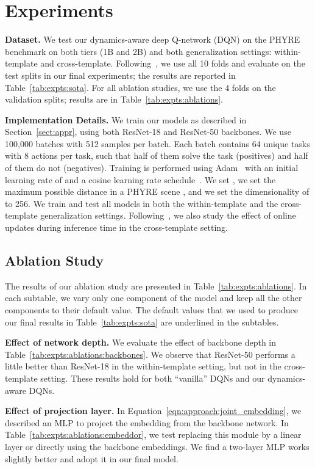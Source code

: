 \documentclass{article}
\begin{document}
\section{Experiments}
\label{sect:expts}
{\bf \noindent Dataset.}
We test our dynamics-aware deep Q-network (DQN) on the PHYRE benchmark on both tiers (1B and 2B) and both generalization settings: within-template and cross-template. Following~\cite{bakhtin2019phyre}, we use all 10 folds and evaluate on the test splits in our final experiments; the results are reported in Table~\ref{tab:expts:sota}. For all ablation studies, we use the 4 folds on the validation splits; results are in Table~\ref{tab:expts:ablations}.

{\bf \noindent Implementation Details.}
We train our models as described in Section~\ref{sect:appr}, using both ResNet-18 and ResNet-50 backbones.
We use 100,000 batches with 512 samples per batch. Each batch contains 64 unique tasks with 8 actions per task, such that half of them solve the task (positives) and half of them do not (negatives).
Training is performed using Adam~\cite{Kingma14} with an initial learning rate of  and a cosine learning rate schedule~\cite{loshchilov2016}.
We set , we set the maximum possible distance in a PHYRE scene , and we set the dimensionality of  to 256.
We train and test all models in both the within-template and the cross-template generalization settings.
Following~\cite{bakhtin2019phyre}, we also study the effect of online updates during inference time in the cross-template setting.

\subsection{Ablation Study}\label{sec:ablations}
The results of our ablation study are presented in Table~\ref{tab:expts:ablations}.
In each subtable, we vary only one component of the model and keep all the other components to their default value.
The default values that we used to produce our final results in Table~\ref{tab:expts:sota} are underlined in the subtables.

{\bf \noindent Effect of network depth.} We evaluate the effect of backbone depth in Table~\ref{tab:expts:ablations:backbones}. We observe that ResNet-50 performs a little better than ResNet-18 in the within-template setting, but not in the cross-template setting. These results hold for both ``vanilla'' DQNs and our dynamics-aware DQNs.

{\bf  \noindent  Effect of projection layer.} In Equation~\ref{eqn:approach:joint_embedding}, we described an MLP to project the embedding from the backbone network. In Table~\ref{tab:expts:ablations:embeddor}, we test replacing this module by a linear layer or directly using the backbone embeddings.
We find a two-layer MLP works slightly better and adopt it in our final model.
\end{document}
